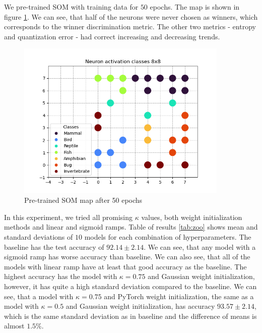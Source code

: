 We pre-trained SOM with training data for $50$ epochs. The map is shown in figure \ref{fig:som-zoo}. We can see, that half of the neurons were never chosen as winners, which corresponds to the winner discrimination metric. The other two metrics - entropy and quantization error - had correct increasing and decreasing trends.

\begin{figure}[h!]
    \centering
    \includegraphics[width=0.9\textwidth]{figs/som1710884692.939712.png}
    \caption{Pre-trained SOM map after 50 epochs}
    \label{fig:som-zoo}
\end{figure}


In this experiment, we tried all promising $\kappa$ values, both weight initialization methods and linear and sigmoid ramps. Table of results \ref{tab:zoo} shows mean and standard deviations of $10$ models for each combination of hyperparameters. The baseline has the test accuracy of $92.14\pm 2.14$. We can see, that any model with a sigmoid ramp has worse accuracy than baseline. We can also see, that all of the models with linear ramp have at least that good accuracy as the baseline. The highest accuracy has the model with $\kappa = 0.75$ and Gaussian weight initialization, however, it has quite a high standard deviation compared to the baseline. We can see, that a model with $\kappa = 0.75$ and PyTorch weight initialization, the same as a model with $\kappa = 0.5$ and Gaussian weight initialization, has accuracy $93.57\pm 2.14$, which is the same standard deviation as in baseline and the difference of means is almost $1.5\%$.

